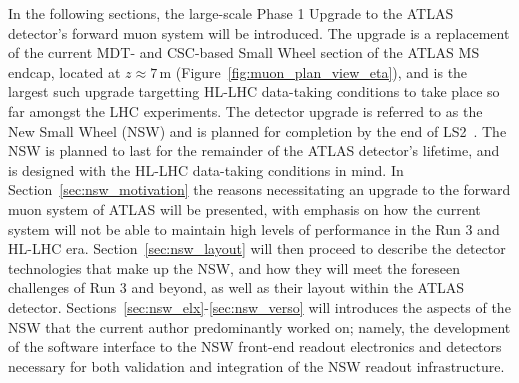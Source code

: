 In the following sections, the large-scale Phase 1 Upgrade to the ATLAS detector's forward muon system
will be introduced.
The upgrade is a replacement of the current MDT- and CSC-based Small Wheel section of the ATLAS MS endcap, located at $z \approx 7$\,m (Figure~\ref{fig:muon_plan_view_eta}),
and is the largest such upgrade targetting HL-LHC data-taking conditions to take place so far amongst the LHC experiments.
The detector upgrade is referred to as the New Small Wheel (NSW) and is planned for completion by
the end of LS2~\cite{NSWTDR}.
The NSW is planned to last for the remainder of the ATLAS detector's lifetime, and is designed with the
HL-LHC data-taking conditions in mind.
In Section~\ref{sec:nsw_motivation} the reasons necessitating an upgrade to the forward muon system
of ATLAS will be presented, with emphasis on how the current system will not be able to maintain high
levels of performance in the Run 3 and HL-LHC era.
Section~\ref{sec:nsw_layout} will then proceed to describe the detector technologies that make up
the NSW, and how they will meet the foreseen challenges of Run 3 and beyond, as well as their layout
within the ATLAS detector.
Sections~\ref{sec:nsw_elx}-\ref{sec:nsw_verso} will introduces the aspects of the NSW that the
current author predominantly worked on; namely, the development of the software interface to the NSW front-end readout
electronics and detectors necessary for both validation and integration of the NSW readout infrastructure.




\FloatBarrier


\FloatBarrier



